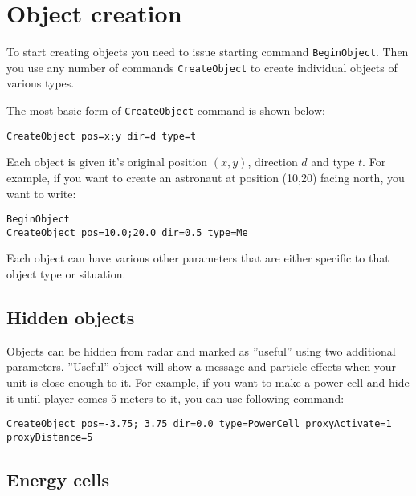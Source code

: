 \section{Object creation}

To start creating objects you need to issue starting command \texttt{BeginObject}. Then you use any number of commands \texttt{CreateObject} to create individual objects of various types.

The most basic form of \texttt{CreateObject} command is shown below:

\begin{verbatim}
CreateObject pos=x;y dir=d type=t
\end{verbatim}

Each object is given it's original position $(x, y)$, direction $d$ and type $t$. For example, if you want to create an astronaut at position (10,20) facing north, you want to write:

\begin{verbatim}
BeginObject
CreateObject pos=10.0;20.0 dir=0.5 type=Me
\end{verbatim}

Each object can have various other parameters that are either specific to that object type or situation.


\subsection{Hidden objects}

Objects can be hidden from radar and marked as ''useful'' using two additional parameters. ''Useful'' object will show a message and particle effects when your unit is close enough to it. For example, if you want to make a power cell and hide it until player comes 5 meters to it, you can use following command:

\begin{verbatim}
CreateObject pos=-3.75; 3.75 dir=0.0 type=PowerCell proxyActivate=1 proxyDistance=5
\end{verbatim}



\subsection{Energy cells}

